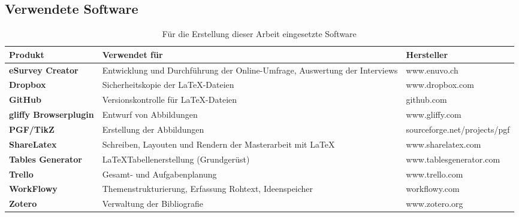 \documentclass[main.tex]{subfiles}
\begin{document}
\subsection*{Verwendete Software}


\begin{table}[H]
\caption{Für die Erstellung dieser Arbeit eingesetzte Software}
\label{used-sw}


\begin{tabular}{ |p{3cm}|p{8.5cm}|p{4cm}| }


\hline
\rowcolor[HTML]{C0C0C0} 
\textbf{Produkt} & \textbf{Verwendet für} & \textbf{Hersteller}\\ 
\hline


\textbf{eSurvey Creator} & Entwicklung und Durchführung der Online-Umfrage, \newline Auswertung der Interviews & www.enuvo.ch\\ \hline
\textbf{Dropbox} & Sicherheitskopie der \LaTeX  -Dateien & www.dropbox.com \\ \hline
\textbf{GitHub} & Versionskontrolle für \LaTeX  -Dateien & github.com \\ \hline
\textbf{gliffy Browserplugin} & Entwurf von Abbildungen & www.gliffy.com \\ \hline
\textbf{PGF/TikZ} & Erstellung der Abbildungen & sourceforge.net/projects/pgf \\ \hline
\textbf{ShareLatex} & Schreiben, Layouten und Rendern der Masterarbeit mit \LaTeX & www.sharelatex.com \\ \hline
\textbf{Tables Generator} & \LaTeX Tabellenerstellung (Grundgerüst)  & www.tablesgenerator.com \\ \hline
\textbf{Trello} & Gesamt- und Aufgabenplanung  & www.trello.com \\ \hline
\textbf{WorkFlowy} & Themenstrukturierung, Erfassung Rohtext, Ideenspeicher & workflowy.com \\ \hline
\textbf{Zotero} & Verwaltung der Bibliografie & www.zotero.org \\ \hline

\end{tabular}
\end{table}
\end{document}
